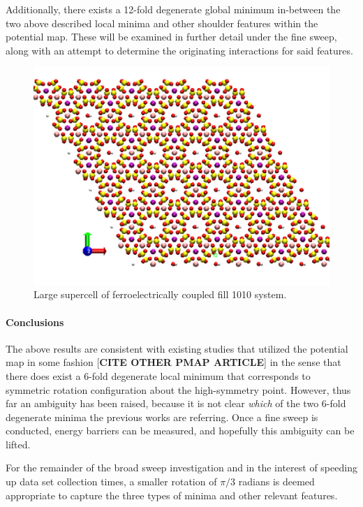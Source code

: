         Additionally, there exists a 12-fold degenerate global minimum in-between the two above described local minima and other shoulder features within the potential map. These will be examined in further detail under the fine sweep, along with an attempt to determine the originating interactions for said features.
        
        \begin{figure}
            \centering
            \includegraphics[width=0.8\linewidth]{Figures/System/supercell.png}
            \caption{Large supercell of ferroelectrically coupled fill 1010 system.}
            \label{fig:supercell}
        \end{figure}
        
        \paragraph{Conclusions} The above results are consistent with existing studies that utilized the potential map in some fashion \cite{vibr_states} [\textbf{CITE OTHER PMAP ARTICLE}] in the sense that there does exist a 6-fold degenerate local minimum that corresponds to symmetric rotation configuration about the high-symmetry point. However, thus far an ambiguity has been raised, because it is not clear \textit{which} of the two 6-fold degenerate minima the previous works are referring. Once a fine sweep is conducted, energy barriers can be measured, and hopefully this ambiguity can be lifted.
        
        For the remainder of the broad sweep investigation and in the interest of speeding up data set collection times, a smaller rotation of $\pi/3$ radians is deemed appropriate to capture the three types of minima and other relevant features. 
        
